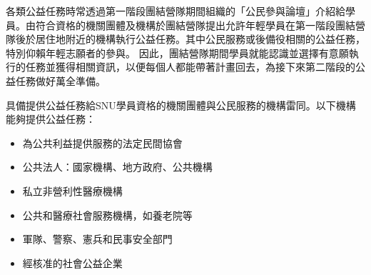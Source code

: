 \documentclass[a4paper,14pt]{extarticle}
\theoremstyle{plain}
\theoremstyle{remark}
\numberwithin{equation}{section}
\begin{document}
各類公益任務時常透過第一階段團結營隊期間組織的「公民參與論壇」介紹給學員。由符合資格的機關團體及機構於團結營隊提出允許年輕學員在第一階段團結營隊後於居住地附近的機構執行公益任務。其中公民服務或後備役相關的公益任務，特別仰賴年輕志願者的參與。
因此，團結營隊期間學員就能認識並選擇有意願執行的任務並獲得相關資訊，以便每個人都能帶著計畫回去，為接下來第二階段的公益任務做好萬全準備。

%
%

\par 
具備提供公益任務給SNU學員資格的機關團體與公民服務的機構雷同。以下機構能夠提供公益任務：

\begin{itemize}
\item 為公共利益提供服務的法定民間協會
\item 公共法人：國家機構、地方政府、公共機構
\item 私立非營利性醫療機構
\item 公共和醫療社會服務機構，如養老院等
\item 軍隊、警察、憲兵和民事安全部門
\item 經核准的社會公益企業
\end{itemize}

%
%
%
\end{document}
